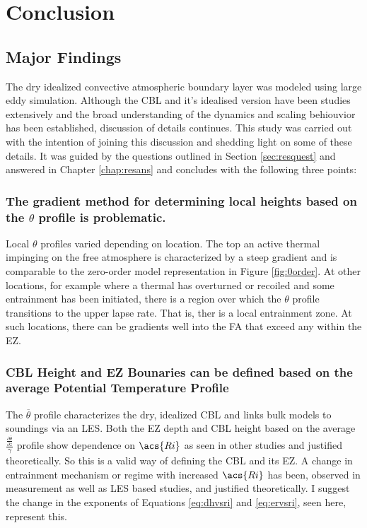 
\chapter{Conclusion}
\label{ch:conc}
\setlength{\parindent}{0cm}

\section{Major Findings}

The dry idealized convective atmospheric boundary layer was modeled using large eddy simulation.  Although the \acs{CBL} and it's idealised version have been studies extensively and the broad understanding of the dynamics and scaling behiouvior has been established, discussion of details continues.  This study was carried out with the intention of joining this discussion and shedding light on some of these details.  It was guided by the questions outlined in Section \ref{sec:resquest} and answered in Chapter \ref{chap:resans} and concludes with the following three points:    


\subsection{The gradient method for determining local heights based on the $\theta$ profile is problematic.}

Local $\theta$ profiles varied depending on location.  The top an active thermal impinging on the free atmosphere is characterized by a steep gradient and is comparable to the zero-order model representation in Figure \ref{fig:0order}.  At other locations, for example where a thermal has overturned or recoiled and some entrainment has been initiated, there is a region over which the $\theta$ profile transitions to the upper lapse rate. That is, ther is a local entrainment zone.  At such locations, there can be gradients well into the \acs{FA} that exceed any within the \acs{EZ}.  

\subsection{\acs{CBL} Height and \acs{EZ} Bounaries can be defined based on the average Potential Temperature Profile}

The $\overline{\theta}$ profile characterizes the dry, idealized \acs{CBL} and links bulk models to soundings via an \acs{LES}.  Both the \acs{EZ} depth and \acs{CBL} height based on the average $\frac{\frac{\partial \overline{\theta}}{\partial z}}{\gamma}$ profile show dependence on $\acs{Ri}$ as seen in other studies and justified theoretically.  So this is a valid way of defining the \acs{CBL} and its \acs{EZ}.  A change in entrainment mechanism or regime with increased $\acs{Ri}$ has been, observed in measurement as well as \acs{LES} based studies, and justified theoretically. I suggest the change in the exponents of Equations \ref{eq:dhvsri} and \ref{eq:ervsri}, seen here, represent this.\\

